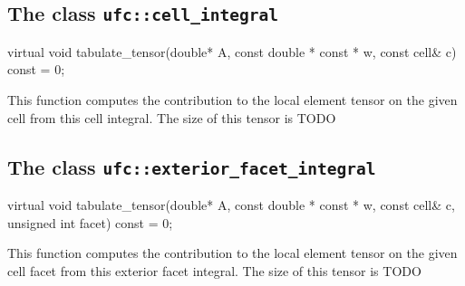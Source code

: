 

\subsection{The class \texttt{ufc::cell\_integral}}
\begin{code}
virtual void tabulate_tensor(double* A,
                             const double * const * w,
                             const cell& c) const = 0;
\end{code}
This function computes the contribution to the local element tensor
on the given cell from this cell integral.
The size of this tensor is TODO










\subsection{The class \texttt{ufc::exterior\_facet\_integral}}
\begin{code}
virtual void tabulate_tensor(double* A,
                             const double * const * w,
                             const cell& c,
                             unsigned int facet) const = 0;
\end{code}
This function computes the contribution to the local element tensor
on the given cell facet from this exterior facet integral.
The size of this tensor is TODO



